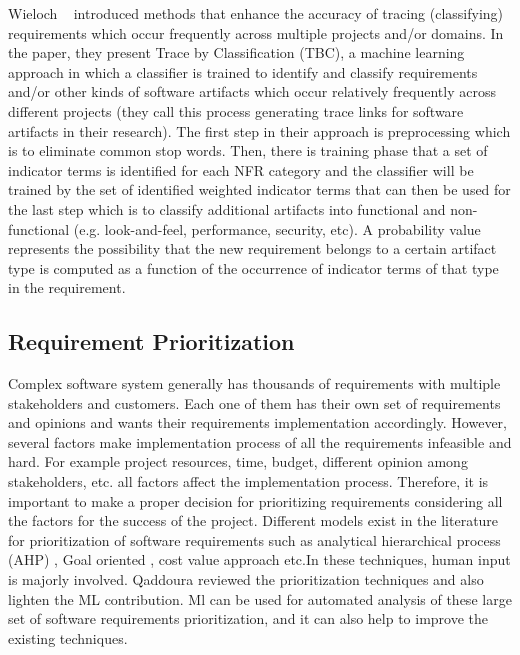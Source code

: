 Wieloch \etal~\cite{Wieloch:2013} introduced methods that enhance the accuracy of tracing (classifying) requirements which occur frequently across multiple projects and/or domains. In the paper, they present Trace by  Classification (TBC),  a machine learning approach in which a classifier is trained to identify and classify requirements and/or other kinds of software artifacts which occur relatively frequently across different projects (they call this process generating trace links for software artifacts in their research). The first step in their approach is preprocessing which is to eliminate common stop words. Then, there is training phase that a set of indicator terms is identified for each NFR category and the classifier will be trained by the set of identified weighted indicator terms that can then be used for the last step which is to classify additional artifacts into functional and non-functional (e.g. look-and-feel, performance, security, etc). A probability value represents the possibility that the new requirement belongs to a certain artifact type is computed as a function of the occurrence of indicator terms of that type in the requirement. 

\subsection{Requirement Prioritization}
Complex software system generally has thousands of requirements with multiple stakeholders and customers. Each one of them has their own set of requirements and opinions and wants their requirements implementation accordingly. However, several factors make implementation process of all the requirements infeasible and hard. For example project resources, time, budget, different opinion among stakeholders, etc. all factors affect the implementation process. Therefore, it is important to make a proper decision for prioritizing requirements considering all the factors for the success of the project. Different models exist in the literature for prioritization of software requirements such as analytical hierarchical process (AHP) \cite{saaty2008}, Goal oriented \cite{VanLamsweerde:2001}, cost value approach \cite{Karlsson:1997} etc.In these techniques, human input is majorly involved. Qaddoura \etal \cite{RQaddoura} reviewed the prioritization techniques and also lighten the ML contribution. Ml can be used for automated analysis of these large set of software requirements prioritization, and it can also help to improve the existing techniques. 

